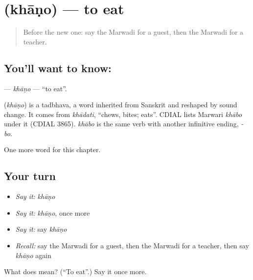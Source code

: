 \section[\texorpdfstring{\mw{खाणो} (khāṇo)}{खाणो (khāṇo)}]{ (khāṇo) — to eat}

\label{lesson:MW-C50-khano}



\begin{quote}
Before the new one: say the Marwadi for a guest, then the Marwadi for a teacher.
\end{quote}

\subsection*{You'll want to know: }
\textbf{} — \emph{khāṇo} — \textquotedblleft{}to eat\textquotedblright{}.

\begin{cousinweb}
\textbf{} (\emph{khāṇo}) is a tadbhava, a word inherited from Sanskrit and reshaped by sound change. It comes from \emph{khādati}, \textquotedblleft{}chews, bites; eats\textquotedblright{}. CDIAL lists Marwari \emph{khābo} under it (CDIAL 3865). \emph{khābo} is the same verb with another infinitive ending, \emph{-bo}.
\end{cousinweb}

\begin{grammarlens}[title={What you've built}]
One more word for this chapter.
\end{grammarlens}

\subsection*{Your turn}
\begin{itemize}
\raggedright
  \item \emph{Say it:} \emph{khāṇo}
  \item \emph{Say it:} \emph{khāṇo}, once more
  \item \emph{Say it:} say \emph{khāṇo}
  \item \emph{Recall:} say the Marwadi for a guest, then the Marwadi for a teacher, then say \emph{khāṇo} again
\end{itemize}

\begin{tcolorbox}[breakable,colback=teal!4,colframe=teal!35!black,title={Before you move on}]
What does  mean? (\textquotedblleft{}To eat\textquotedblright{}.) Say it once more.
\end{tcolorbox}
